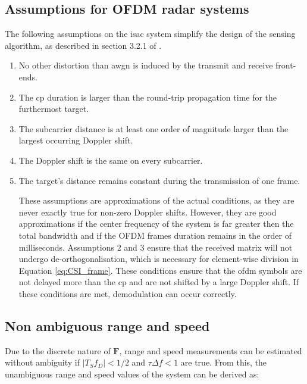     
    \subsection{Assumptions for OFDM radar systems}
    \label{sub:assumptions_ofdm_radar}
    The following assumptions on the \gls{isac} system simplify the design of the sensing algorithm, as described in section 3.2.1 of \cite{Braun2014OFDMRA}.
    
    \begin{enumerate}
    	\item No other distortion than \gls{awgn} is induced by the transmit and receive front-ends.
    	\item The \gls{cp} duration is larger than the round-trip propagation time for the furthermost target.
    	\item The subcarrier distance is at least one order of magnitude larger than the largest occurring Doppler shift.    	
    	\item The Doppler shift is the same on every subcarrier.
    	\item The target’s distance remains constant during the transmission of one frame.
    	
    	These assumptions are approximations of the actual conditions, as they are never exactly true for non-zero Doppler shifts. However, they are good approximations if the center frequency of the system is far greater then the total bandwidth and if the OFDM frames duration remains in the order of milliseconds.
    	Assumptions 2 and 3 ensure that the received matrix will not undergo de-orthogonalisation, which is necessary for element-wise division in Equation \eqref{eq:CSI_frame}. These conditions ensure that the \gls{ofdm} symbols are not delayed more than the \gls{cp} and are not shifted by a large Doppler shift. If these conditions are met, demodulation can occur correctly.
    \end{enumerate}
    
    \subsection{Non ambiguous range and speed}
    
        Due to the discrete nature of $\mathbf{F}$, range and speed measurements can be estimated without ambiguity if $|T_S f_D| < 1/2$ and $\tau \Delta f < 1$ are true.
        From this, the unambiguous range and speed values of the system can be derived as:
        
